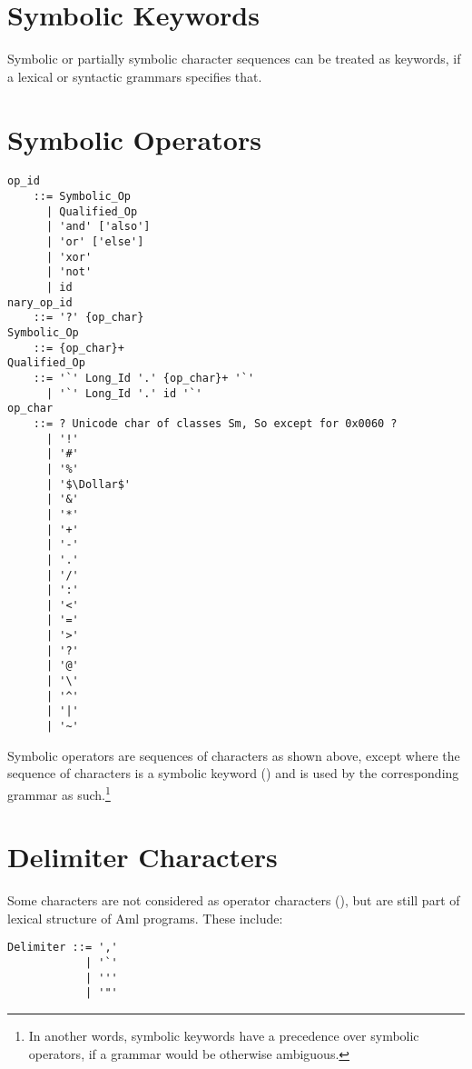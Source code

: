 \section{Symbolic Keywords}
\label{sec:symbolic-keywords}

Symbolic or partially symbolic character sequences can be treated as keywords, if a lexical or syntactic grammars specifies that.





\section{Symbolic Operators}
\label{sec:symbolic-operators}

\syntax\begin{lstlisting}[deletekeywords={of,for}]
op_id 
    ::= Symbolic_Op
      | Qualified_Op
      | 'and' ['also']
      | 'or' ['else']
      | 'xor'
      | 'not'
      | id
nary_op_id 
    ::= '?' {op_char}
Symbolic_Op  
    ::= {op_char}+
Qualified_Op 
    ::= '`' Long_Id '.' {op_char}+ '`'
      | '`' Long_Id '.' id '`'
op_char 
    ::= ? Unicode char of classes Sm, So except for 0x0060 ?
      | '!'
      | '#'
      | '%'
      | '$\Dollar$'
      | '&'
      | '*'
      | '+'
      | '-'
      | '.'
      | '/'
      | ':'
      | '<'
      | '='
      | '>'
      | '?'
      | '@'
      | '\'
      | '^'
      | '|'
      | '~'
\end{lstlisting}

Symbolic operators are sequences of characters as shown above, except where the sequence of characters is a symbolic keyword () and is used by the corresponding grammar as such.\footnote{In another words, symbolic keywords have a precedence over symbolic operators, if a grammar would be otherwise ambiguous.}





\section{Delimiter Characters}
\label{sec:delimiter-characters}

Some characters are not considered as operator characters (), but are still part of lexical structure of Aml programs. These include:

\syntax\begin{lstlisting}[deletekeywords={of}]
Delimiter ::= ','
            | '`'  
            | ''' 
            | '"'
\end{lstlisting}

